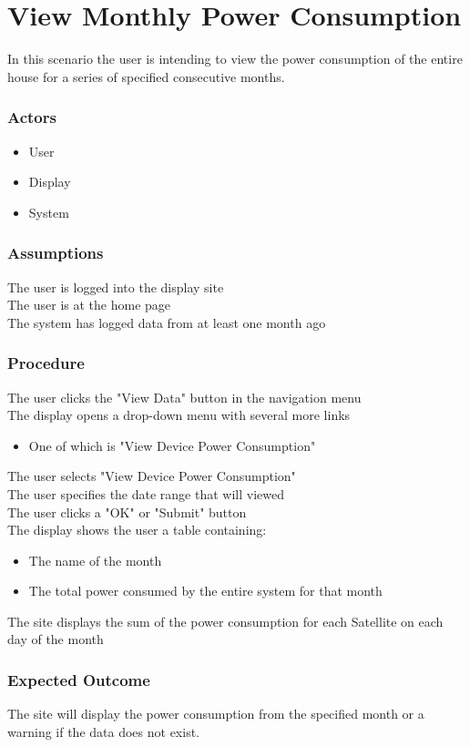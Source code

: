 \section{View Monthly Power Consumption}
In this scenario the user is intending to view the power consumption of the entire house for a series of specified consecutive months.

\subsubsection{Actors}
\begin{itemize}
	\item User
	\item Display
	\item System
\end{itemize}


\subsubsection{Assumptions}

The user is logged into the display site\\
The user is at the home page\\
The system has logged data from at least one month ago 

\subsubsection{Procedure}

The user clicks the "View Data" button in the navigation menu\\
The display opens a drop-down menu with several more links
\begin{itemize}
	\item One of which is "View Device Power Consumption" 
\end{itemize}
The user selects "View Device Power Consumption"\\
The user specifies the date range that will viewed\\
The user clicks a "OK" or "Submit" button\\
The display shows the user a table containing:
\begin{itemize}
	\item The name of the month
	\item The total power consumed by the entire system for that month 
\end{itemize}
The site displays the sum of the power consumption for each Satellite on each day of the month 

\subsubsection{Expected Outcome}

The site will display the power consumption from the specified month or a warning if the data does not exist.